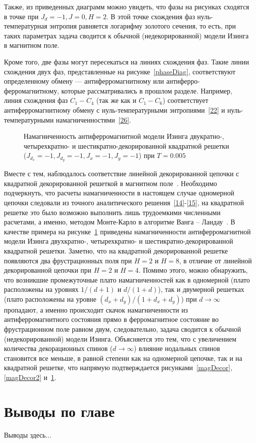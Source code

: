 Также, из приведенных диаграмм можно увидеть, что фазы на рисунках сходятся в точке при $J_d=-1, J=0, H=2$. В этой точке схождения фаз нуль-температурная энтропия равняется логарифму золотого сечения, то есть, при таких параметрах задача сводится к обычной (недекорированной) модели Изинга в магнитном поле.

Кроме того, две фазы могут пересекаться на линиях схождения фаз. Такие линии схождения двух фаз, представленные на рисунке~\ref{phaseDiag}, соответствуют определенному обмену --- антиферромагнитному или антиферро-ферромагнитному, которые рассматривались в прошлом разделе. Например, линия схождения фаз $C_1-C_4$ (так же как и $C_1-C_6$) соответствует антиферромагнитному обмену с нуль-температурными энтропиями~\eqref{22} и нуль-температурными намагниченностями~\eqref{26}.

 \begin{figure}[h]
 	\caption{Намагниченность антиферромагнитной модели Изинга двукратно-, четырехкратно- и шестикратно-декорированной квадратной решетки ($J_{d_x}=-1, J_{d_y}=-1, J_x=-1, J_y=-1$) при $T=0.005$}
 	\label{magDecorSquare}
 \end{figure}

Вместе с тем, наблюдалось соответствие линейной декорированной цепочки с квадратной декорированной решеткой в магнитном поле~\cite{kassan-ogly2020}. Необходимо подчеркнуть, что расчеты намагниченности в настоящем случае одномерной цепочки следовали из точного аналитического решения~\eqref{14}-\eqref{15}, на квадратной решетке это было возможно выполнить лишь трудоемкими численными расчетами, а именно, методом Монте-Карло в алгоритме Ванга -- Ландау~\cite{wang1,wang2}. В качестве примера на рисунке~\ref{magDecorSquare} приведены намагниченности антиферромагнитной модели Изинга двухкратно-, четырехкратно- и шестикратно-декорированной квадратной решетки. Заметно, что на квадратной декорированной решетке появляются два фрустрационных поля при $H=2$ и $H=8$, в отличие от линейной декорированной цепочки при $H=2$ и $H=4$. Помимо этого, можно обнаружить, что возникшие промежуточные плато намагниченностей как в одномерной (плато расположены на уровнях $1/(d+1)$ и $d/(1+d)$), так и двумерной решетках (плато расположены на уровне $(d_x+d_y)/(1+d_x+d_y)$) при $d \rightarrow \infty$ пропадают, а именно происходит скачок намагниченности из антиферромагнитного состояния прямо в ферромагнитное состояние во фрустрационном поле равном двум, следовательно, задача сводится к обычной (недекорированной) модели Изинга. Объясняется это тем, что с увеличением количества декорационных спинов ($d\rightarrow \infty$) влияние нодальных спинов становится все меньше, в равной степени как на одномерной цепочке, так и на квадратной решетке, что напрямую подтверждается рисунками~\ref{magDecor}, \ref{magDecor2} и~\ref{magDecorSquare}.

\section{Выводы по главе}

Выводы здесь...


\FloatBarrier